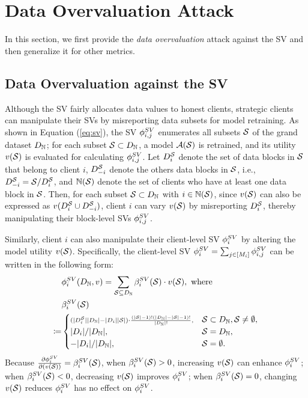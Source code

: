 \section{Data Overvaluation Attack}
In this section, we first provide the \textit{data overvaluation} attack against the SV and then generalize it for other metrics.

\subsection{Data Overvaluation against the SV}
Although the SV fairly allocates data values to honest clients, strategic clients can manipulate their SVs by misreporting data subsets for model retraining.
As shown in Equation (\ref{eq:sv}), the SV $\phi^{SV}_{i, j}$ enumerates all subsets $\mathcal{S}$ of the grand dataset $D_{\mathbb{N}}$; 
for each subset $\mathcal{S} \subset D_{\mathbb{N}}$, a model $\mathcal{A}(\mathcal{S})$ is retrained, and its utility $v(\mathcal{S})$ is evaluated for calculating $\phi^{SV}_{i, j}$. 
Let $D^{\mathcal{S}}_{i}$ denote the set of data blocks in $\mathcal{S}$ that belong to client $i$, $D^{\mathcal{S}}_{-i}$ denote the others data blocks in $\mathcal{S}$, i.e., $D^{\mathcal{S}}_{-i} = \mathcal{S} / D^{\mathcal{S}}_{i}$, and $\mathbb{N}(\mathcal{S})$ denote the set of clients who have at least one data block in $\mathcal{S}$. 
Then, for each subset $\mathcal{S} \subset D_{\mathbb{N}}$ with $i \in \mathbb{N}(\mathcal{S})$, since $v(\mathcal{S})$ can also be expressed as $v(D^{\mathcal{S}}_{i} \cup D^{\mathcal{S}}_{-i})$, client $i$ can vary $v(\mathcal{S})$ by misreporting $D^{\mathcal{S}}_{i}$, thereby manipulating their block-level SVs $\phi^{SV}_{i, j}$.

Similarly, client $i$ can also manipulate their client-level SV $\phi^{SV}_{i}$ by altering the model utility $v(\mathcal{S})$.
Specifically, the client-level SV $\phi^{SV}_{i}=\sum_{j\in[M_i]}\phi^{SV}_{i,j}$ can be written in the following form:
\begin{align*}
     &\phi^{SV}_{i}(D_{\mathbb{N}}, v) = \sum_{\mathcal{S}\subseteq D_{\mathbb{N}}} \beta^{SV}_i(\mathcal{S}) \cdot v(\mathcal{S}), \text{ where} \\
      & \beta^{SV}_i(\mathcal{S}) \\
      \coloneqq &
   \begin{cases}
            \scriptstyle(|D^{\mathcal{S}}_{i}||D_{\mathbb{N}}| - |D_{i}||\mathcal{S}|) \cdot \frac{(|\mathcal{S} |- 1)! (|D_{\mathbb{N}}|-|\mathcal{S}| - 1)!}{|D_{\mathbb{N}}|!}, & \mathcal{S} \subset D_{\mathbb{N}}, \mathcal{S} \neq \emptyset, \\
            |D_i|/ |D_{\mathbb{N}}|, & \mathcal{S} = D_{\mathbb{N}}, \\
            - |D_i|/ |D_{\mathbb{N}}|, & \mathcal{S} = \emptyset.
   \end{cases}
\end{align*}
Because $\frac{\partial \phi^{SV}_i}{\partial (v(\mathcal{S}))} = \beta^{SV}_i(\mathcal{S})$, when $\beta^{SV}_i(\mathcal{S}) > 0$, increasing $v(\mathcal{S})$ can enhance $\phi^{SV}_{i}$; when $\beta^{SV}_i(\mathcal{S}) < 0$, decreasing $v(\mathcal{S})$ improves $\phi^{SV}_{i}$; when $\beta^{SV}_i(\mathcal{S}) = 0$, changing $v(\mathcal{S})$ reduces $\phi^{SV}_{i}$ has no effect on $\phi^{SV}_{i}$.

